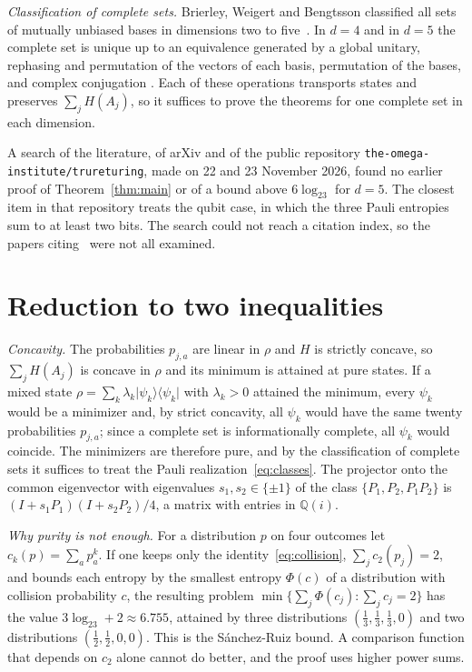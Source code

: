 \documentclass[11pt,a4paper]{article}
\theoremstyle{plain}
\newcommand{\Q}{\mathbb Q}
\newcommand{\ket}[1]{\lvert#1\rangle}
\newcommand{\bra}[1]{\langle#1\rvert}
\begin{document}
\emph{Classification of complete sets.} Brierley, Weigert and Bengtsson
classified all sets of mutually unbiased bases in dimensions two to
five~\cite{BWB2010}. In $d=4$ and in $d=5$ the complete set is unique up to an
equivalence generated by a global unitary, rephasing and permutation of the
vectors of each basis, permutation of the bases, and complex conjugation
\cite[Sec.~3, Sec.~4 and App.~A]{BWB2010}. Each of these operations transports
states and preserves $\sum_jH(A_j)$, so it suffices to prove the theorems for
one complete set in each dimension.

A search of the literature, of arXiv and of the public repository
\texttt{the-omega-\allowbreak institute/\allowbreak trureturing}, made on 22
and 23 November 2026, found no earlier proof of Theorem~\ref{thm:main} or of a
bound above $6\log_23$ for $d=5$. The closest item in that repository treats
the qubit case, in which the three Pauli entropies sum to at least two bits.
The search could not reach a citation index, so the papers citing~\cite{RMM2017}
were not all examined.

\section{Reduction to two inequalities}\label{sec:reduction}

\emph{Concavity.} The probabilities $p_{j,a}$ are linear in $\rho$ and $H$ is
strictly concave, so $\sum_jH(A_j)$ is concave in $\rho$ and its minimum is
attained at pure states. If a mixed state
$\rho=\sum_k\lambda_k\ket{\psi_k}\bra{\psi_k}$ with $\lambda_k>0$ attained the
minimum, every $\psi_k$ would be a minimizer and, by strict concavity, all
$\psi_k$ would have the same twenty probabilities $p_{j,a}$; since a complete
set is informationally complete, all $\psi_k$ would coincide. The minimizers are
therefore pure, and by the classification of complete sets it suffices to treat
the Pauli realization~\eqref{eq:classes}. The projector onto the common
eigenvector with eigenvalues $s_1,s_2\in\{\pm1\}$ of the class
$\{P_1,P_2,P_1P_2\}$ is $(I+s_1P_1)(I+s_2P_2)/4$, a matrix with entries in
$\Q(i)$.

\emph{Why purity is not enough.} For a distribution $p$ on four outcomes let
$c_k(p)=\sum_ap_a^k$. If one keeps only the identity~\eqref{eq:collision},
$\sum_jc_2(p_j)=2$, and bounds each entropy by the smallest entropy
$\Phi(c)$ of a distribution with collision probability $c$, the resulting
problem $\min\{\sum_j\Phi(c_j):\sum_jc_j=2\}$ has the value
$3\log_23+2\approx6.755$, attained by three distributions
$(\tfrac13,\tfrac13,\tfrac13,0)$ and two distributions
$(\tfrac12,\tfrac12,0,0)$. This is the S\'anchez-Ruiz bound. A comparison
function that depends on $c_2$ alone cannot do better, and the proof uses higher
power sums.
\end{document}
